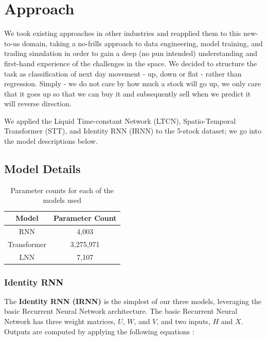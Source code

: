 \documentclass[10pt,twocolumn,letterpaper]{article}
\begin{document}
    \section{Approach}
We took existing approaches in other industries and reapplied them to this new-to-us domain, taking a no-frills approach to data engineering, model training, and trading simulation in order to gain a deep (no pun intended) understanding and first-hand experience of the challenges in the space. We decided to structure the task as classification of next day movement - up, down or flat - rather than regression. Simply - we do not care by how much a stock will go up, we only care that it goes up so that we can buy it and subsequently sell when we predict it will reverse direction.

We applied the  Liquid Time-constant Network (LTCN), Spatio-Temporal Transformer (STT), and Identity RNN (IRNN) to the 5-stock dataset; we go into the model descriptions below.

    \subsection{Model Details}

\begin{table}
\begin{center}
    \begin{tabular}{|c|c|}
\hline
        Model & Parameter Count \\
\hline
        RNN & 4,003 \\
\hline
        Transformer & 3,275,971 \\
\hline
        LNN & 7,107 \\
\hline
\end{tabular}
\end{center}
    \caption{Parameter counts for each of the models used}
\label{tab:parametercounts}
\end{table}

    \subsubsection{Identity RNN}

    The \textbf{Identity RNN (IRNN) \cite{irnn_initialize}} is the simplest of our three models, leveraging the basic Recurrent Neural Network architecture. The basic Recurrent Neural Network has three weight matrices, $U$, $W$, and $V$, and two inputs, $H$ and $X$. Outputs are computed by applying the following equations \cite{deep_learning_book}:
\end{document}
